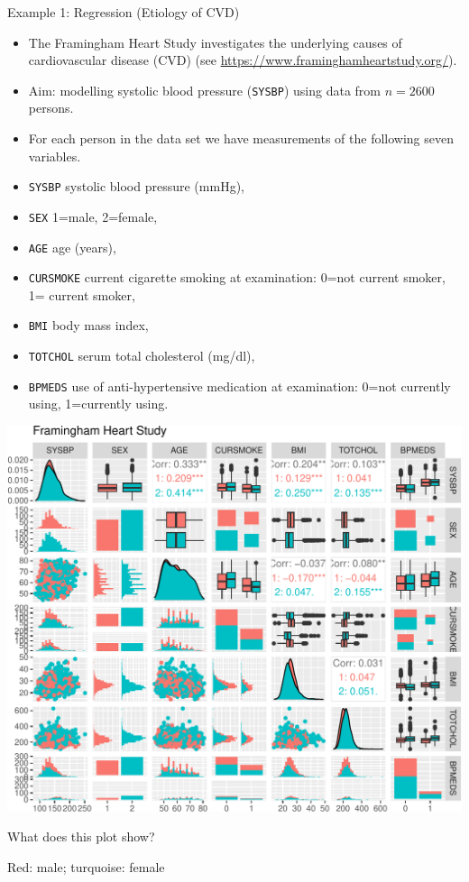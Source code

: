 \documentclass[
  10pt,
  ignorenonframetext,
]{beamer}
\providecommand{\tightlist}{%
  \setlength{\itemsep}{0pt}\setlength{\parskip}{0pt}}
\begin{document}
\begin{frame}[fragile]{Example 1: Regression (Etiology of CVD)}
\protect\hypertarget{example-1-regression-etiology-of-cvd}{}
\begin{itemize}
\item
  The Framingham Heart Study investigates the underlying causes of
  cardiovascular disease (CVD) (see
  \url{https://www.framinghamheartstudy.org/}).
\item
  Aim: modelling systolic blood pressure (\texttt{SYSBP}) using data
  from \(n=2600\) persons.
\item
  For each person in the data set we have measurements of the following
  seven variables.
\end{itemize}

\scriptsize

\begin{itemize}
\tightlist
\item
  \texttt{SYSBP} systolic blood pressure (mmHg),
\item
  \texttt{SEX} 1=male, 2=female,
\item
  \texttt{AGE} age (years),
\item
  \texttt{CURSMOKE} current cigarette smoking at examination: 0=not
  current smoker, 1= current smoker,
\item
  \texttt{BMI} body mass index,
\item
  \texttt{TOTCHOL} serum total cholesterol (mg/dl),
\item
  \texttt{BPMEDS} use of anti-hypertensive medication at examination:
  0=not currently using, 1=currently using. \normalsize
\end{itemize}
\end{frame}

\begin{frame}
\begin{center}\includegraphics[width=1\linewidth]{1Intro_files/figure-beamer/CVDread-1} \end{center}

What does this plot show?

Red: male; turquoise: female
\end{frame}
\end{document}
